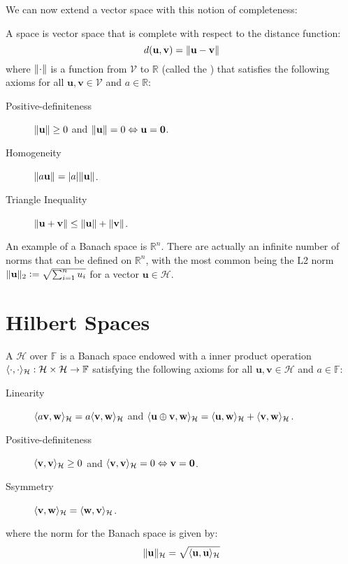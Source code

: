 We can now extend a vector space with this notion of completeness:
%
\begin{definition}
A  space is vector space that is complete with respect to the distance function:
\begin{equation}
  d(\mathbf{u}, \mathbf{v}) = \lVert\mathbf{u} - \mathbf{v}\rVert
\end{equation}
where $\lVert\cdot\rVert$ is a function from $\mathcal{V}$ to $\mathbb{R}$ (called the ) that satisfies the following axioms for all $\mathbf{u}, \mathbf{v} \in \mathcal{V}$ and $a \in \mathbb{R}$:
\begin{description}
  \item[Positive-definiteness] $\lVert\mathbf{u}\rVert \geq 0$ and $\lVert\mathbf{u}\rVert = 0 \Leftrightarrow \mathbf{u} = \mathbf{0}$.
  \item[Homogeneity] $\lVert a \mathbf{u}\rVert = \lvert a\rvert \lVert\mathbf{u}\rVert$.
  \item[Triangle Inequality] $\lVert\mathbf{u} + \mathbf{v}\rVert \leq \lVert\mathbf{u}\rVert + \lVert\mathbf{v}\rVert$.
\end{description}
\end{definition}

An example of a Banach space is $\mathbb{R}^n$. There are actually an infinite number of norms that can be defined on $\mathbb{R}^n$, with the most common being the L2 norm $\lVert\mathbf{u}\rVert_2 \vcentcolon= \sqrt{\sum_{i=1}^n u_i}$ for a vector $\mathbf{u} \in \mathcal{H}$. 

\section{Hilbert Spaces}

\begin{definition}
A  $\mathcal{H}$ over $\mathbb{F}$ is a Banach space endowed with a inner product operation $\langle\cdot, \cdot\rangle_\mathcal{H} : \mathcal{H} \times \mathcal{H} \to \mathbb{F}$ satisfying the following axioms for all $\mathbf{u}, \mathbf{v} \in \mathcal{H}$ and $a \in \mathbb{F}$:
%
\begin{description}
  \item[Linearity] $\langle a \mathbf{v}, \mathbf{w}\rangle_\mathcal{H} = a \langle\mathbf{v}, \mathbf{w}\rangle_\mathcal{H}$ and $\langle\mathbf{u} \oplus \mathbf{v}, \mathbf{w}\rangle_\mathcal{H} = \langle\mathbf{u}, \mathbf{w}\rangle_\mathcal{H} + \langle\mathbf{v}, \mathbf{w}\rangle_\mathcal{H}$.
  \item[Positive-definiteness] $\langle\mathbf{v}, \mathbf{v}\rangle_\mathcal{H} \geq 0$ and $\langle\mathbf{v}, \mathbf{v}\rangle_\mathcal{H} = 0 \Leftrightarrow \mathbf{v} = \mathbf{0}$.
  \item[Ssymmetry] $\langle\mathbf{v}, \mathbf{w}\rangle_\mathcal{H} = \langle\mathbf{w}, \mathbf{v}\rangle_\mathcal{H}$.
\end{description}
%
where the norm for the Banach space is given by:
%
\begin{equation}
  \lVert\mathbf{u}\rVert_\mathcal{H} = \sqrt{\langle\mathbf{u}, \mathbf{u}\rangle_\mathcal{H}}
\end{equation}
%
\end{definition}

